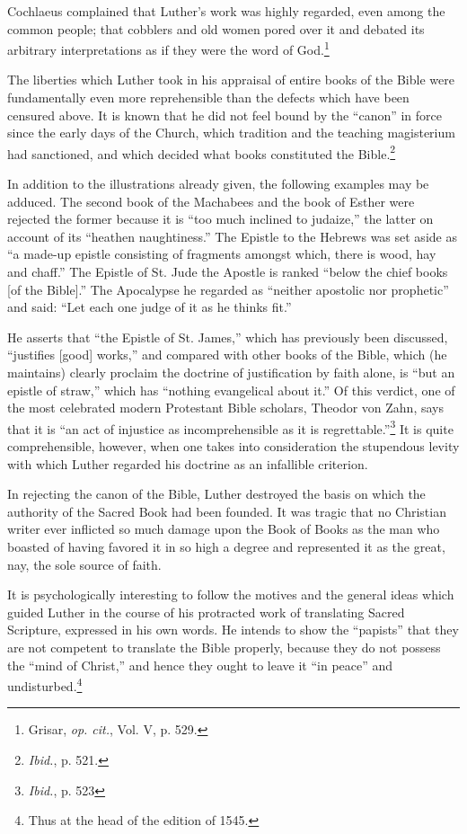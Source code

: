 Cochlaeus complained that Luther’s work was highly regarded,
even among the common people; that cobblers and old women pored
over it and debated its arbitrary interpretations as if they were the
word of God.\footnote{Grisar, \textit{op. cit.}, Vol. V, p. 529.}


The liberties which Luther took in his appraisal of entire books of
the Bible were fundamentally even more reprehensible than the defects
which have been censured above. It is known that he did not feel
bound by the “canon” in force since the early days of the Church,
which tradition and the teaching magisterium had sanctioned, and
which decided what books constituted the Bible.\footnote{\textit{Ibid.}, p. 521.}


In addition to the illustrations already given, the following examples may
be adduced. The second book of the Machabees and the book of Esther were
rejected the former because it is “too much inclined to judaize,” the latter
on account of its “heathen naughtiness.” The Epistle to the Hebrews was
set aside as “a made-up epistle consisting of fragments amongst which,
there is wood, hay and chaff.” The Epistle of St. Jude the Apostle is
ranked “below the chief books [of the Bible].” The Apocalypse he regarded
as “neither apostolic nor prophetic” and said: “Let each one judge of it as he
thinks fit.”

He asserts that “the Epistle of St. James,” which has previously been discussed,
“justifies [good] works,” and compared with other books of the
Bible, which (he maintains) clearly proclaim the doctrine of justification
by faith alone, is “but an epistle of straw,” which has “nothing
evangelical about it.” Of this verdict, one of the most celebrated modern
Protestant Bible scholars, Theodor von Zahn, says that it is “an act of injustice
as incomprehensible as it is regrettable.”\footnote{\textit{Ibid.}, p. 523}
 It is quite comprehensible,
however, when one takes into consideration the stupendous levity with which
Luther regarded his doctrine as an infallible criterion.

In rejecting the canon of the Bible, Luther destroyed the basis on
which the authority of the Sacred Book had been founded. It was
tragic that no Christian writer ever inflicted so much damage upon
the Book of Books as the man who boasted of having favored it in so
high a degree and represented it as the great, nay, the sole source of
faith.

It is psychologically interesting to follow the motives and the
general ideas which guided Luther in the course of his protracted
work of translating Sacred Scripture, expressed in his own words.
He intends to show the “papists” that they are not competent to
translate the Bible properly, because they do not possess the “mind of
Christ,” and hence they ought to leave it “in peace” and undisturbed.\footnote{Thus at the head of the edition of 1545.}


